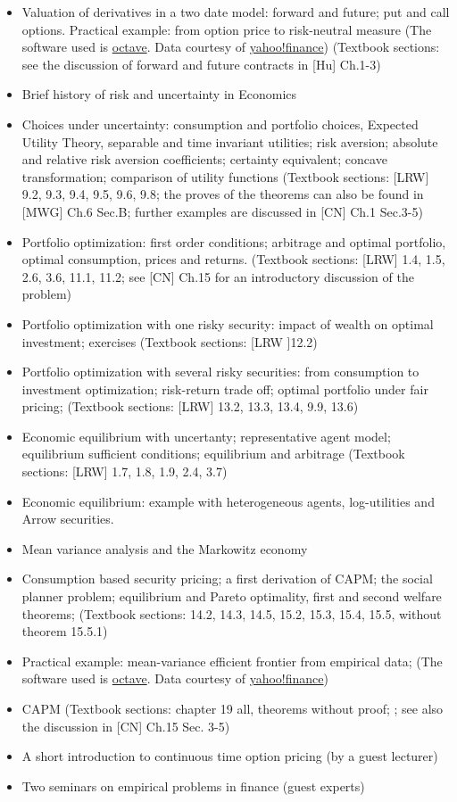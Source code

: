 \documentclass[11pt]{article}
\begin{document}
\begin{itemize}
probabilities; (Textbook sections: [LRW] 5.2, 5.3, 5.5, 6.3, 6.4,
6.5, 6.6, 6.7;)
\item Valuation of derivatives in a two date model: forward and future;
put and call options. Practical example: from option price to
risk-neutral measure (The software used is \href{http://www.gnu.org/software/octave/}{octave}. Data courtesy
of \href{http://finance.yahoo.com/}{yahoo!finance}) (Textbook sections: see the discussion of
forward and future contracts in [Hu] Ch.1-3)
\item Brief history of risk and uncertainty in Economics
\item Choices under uncertainty: consumption and portfolio choices,
Expected Utility Theory, separable and time invariant utilities;
risk aversion; absolute and relative risk aversion coefficients;
certainty equivalent; concave transformation; comparison of
utility functions (Textbook sections: [LRW] 9.2, 9.3, 9.4, 9.5,
9.6, 9.8; the proves of the theorems can also be found in [MWG]
Ch.6 Sec.B; further examples are discussed in [CN] Ch.1 Sec.3-5)
\item Portfolio optimization: first order conditions; arbitrage and
optimal portfolio, optimal consumption, prices and
returns. (Textbook sections: [LRW] 1.4, 1.5, 2.6, 3.6, 11.1, 11.2;
see [CN] Ch.15 for an introductory discussion of the problem)
\item Portfolio optimization with one risky security: impact of wealth
on optimal investment; exercises (Textbook sections: [LRW ]12.2)
\item Portfolio optimization with several risky securities: from
consumption to investment optimization; risk-return trade off;
optimal portfolio under fair pricing; (Textbook sections: [LRW]
13.2, 13.3, 13.4, 9.9, 13.6)
\item Economic equilibrium with uncertanty; representative agent model;
equilibrium sufficient conditions; equilibrium and arbitrage
(Textbook sections: [LRW] 1.7, 1.8, 1.9, 2.4, 3.7)
\item Economic equilibrium: example with heterogeneous agents,
log-utilities and Arrow securities.
\item Mean variance analysis and the Markowitz economy
\item Consumption based security pricing; a first derivation of CAPM;
the social planner problem; equilibrium and Pareto optimality,
first and second welfare theorems; (Textbook sections: 14.2, 14.3,
14.5, 15.2, 15.3, 15.4, 15.5, without theorem 15.5.1)
\item Practical example: mean-variance efficient frontier from empirical
data; (The software used is \href{http://www.gnu.org/software/octave/}{octave}. Data courtesy of
\href{http://finance.yahoo.com/}{yahoo!finance})
\item CAPM (Textbook sections: chapter 19 all, theorems without proof; ;
see also the discussion in [CN] Ch.15 Sec. 3-5)
\item A short introduction to continuous time option pricing (by a guest
lecturer)
\item Two seminars on empirical problems in finance (guest experts)
\end{itemize}
\end{document}
